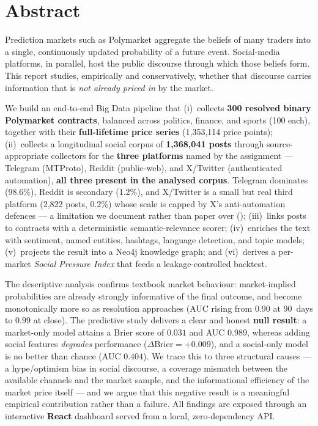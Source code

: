 \documentclass[11pt,a4paper]{report}
\begin{document}
\thispagestyle{empty}
\chapter*{Abstract}
\noindent
Prediction markets such as Polymarket aggregate the beliefs of many traders into a
single, continuously updated probability of a future event. Social-media platforms,
in parallel, host the public discourse through which those beliefs form. This report
studies, empirically and conservatively, whether that discourse carries information
that is \emph{not already priced in} by the market.

We build an end-to-end Big Data pipeline that (i)~collects \textbf{300 resolved
binary Polymarket contracts}, balanced across politics, finance, and sports
(100 each), together with their \textbf{full-lifetime price series}
(1{,}353{,}114 price points); (ii)~collects a longitudinal social corpus of
\textbf{1{,}368{,}041 posts} through source-appropriate collectors for the
\textbf{three platforms} named by the assignment --- Telegram (MTProto), Reddit
(public-web), and X/Twitter (authenticated automation), \textbf{all three present in
the analysed corpus}. Telegram dominates (98.6\%), Reddit is secondary (1.2\%), and
X/Twitter is a small but real third platform (2{,}822 posts, 0.2\%) whose scale is
capped by X's anti-automation defences --- a limitation we document rather than paper
over (); (iii)~links posts to
contracts with a deterministic semantic-relevance scorer; (iv)~enriches the text
with sentiment, named entities, hashtags, language detection, and topic models;
(v)~projects the result into a Neo4j knowledge graph; and (vi)~derives a per-market
\emph{Social Pressure Index} that feeds a leakage-controlled backtest.

The descriptive analysis confirms textbook market behaviour: market-implied
probabilities are already strongly informative of the final outcome, and become
monotonically more so as resolution approaches (AUC rising from $0.90$ at
90~days to $0.99$ at close). The predictive study delivers a clear and honest
\textbf{null result}: a market-only model attains a Brier score of $0.031$ and
AUC $0.989$, whereas adding social features \emph{degrades} performance
($\Delta\text{Brier}=+0.009$), and a social-only model is no better than chance
(AUC $0.404$). We trace this to three structural causes --- a hype/optimism bias in
social discourse, a coverage mismatch between the available channels and the market
sample, and the informational efficiency of the market price itself --- and we argue
that this negative result is a meaningful empirical contribution rather than a
failure. All findings are exposed through an interactive \textbf{React} dashboard
served from a local, zero-dependency API.
\end{document}
